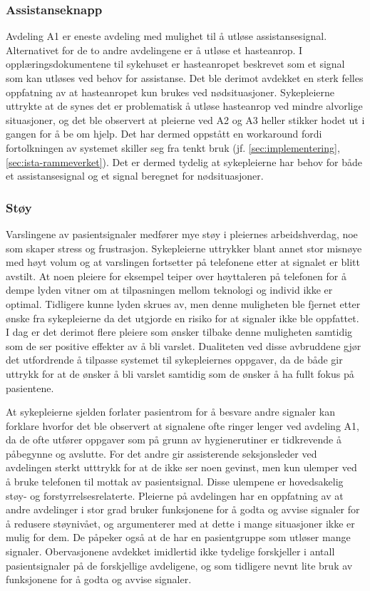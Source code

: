 \subsubsection{Assistanseknapp}
Avdeling A1 er eneste avdeling med mulighet til å utløse assistansesignal. Alternativet for de to andre avdelingene er å utløse et hasteanrop. I opplæringsdokumentene til sykehuset er hasteanropet beskrevet som et signal som kan utløses ved behov for assistanse. Det ble derimot avdekket en sterk felles oppfatning av at hasteanropet kun brukes ved nødsituasjoner. Sykepleierne uttrykte at de synes det er problematisk å utløse hasteanrop ved mindre alvorlige situasjoner, og det ble observert at pleierne ved A2 og A3 heller stikker hodet ut i gangen for å be om hjelp. Det har dermed oppstått en workaround fordi fortolkningen av systemet skiller seg fra tenkt bruk (jf. \ref{sec:implementering}, \ref{sec:ista-rammeverket}). Det er dermed tydelig at sykepleierne har behov for både et assistansesignal og et signal beregnet for nødsituasjoner.
  
\subsubsection{Støy}
Varslingene av pasientsignaler medfører mye støy i pleiernes arbeidshverdag, noe som skaper stress og frustrasjon. Sykepleierne uttrykker blant annet stor misnøye med høyt volum og at varslingen fortsetter på telefonene etter at signalet er blitt avstilt. At noen pleiere for eksempel teiper over høyttaleren på telefonen for å dempe lyden vitner om at tilpasningen mellom teknologi og individ ikke er optimal. Tidligere kunne lyden skrues av, men denne muligheten ble fjernet etter ønske fra sykepleierne da det utgjorde en risiko for at signaler ikke ble oppfattet. I dag er det derimot flere pleiere som ønsker tilbake denne muligheten samtidig som de ser positive effekter av å bli varslet. Dualiteten ved disse avbruddene gjør det utfordrende å tilpasse systemet til sykepleiernes oppgaver, da de både gir uttrykk for at de ønsker å bli varslet samtidig som de ønsker å ha fullt fokus på pasientene. 

\noindent
At sykepleierne sjelden forlater pasientrom for å besvare andre signaler kan forklare hvorfor det ble observert at signalene ofte ringer lenger ved avdeling A1, da de ofte utfører oppgaver som på grunn av hygienerutiner er tidkrevende å påbegynne og avslutte. For det andre gir assisterende seksjonsleder ved avdelingen sterkt utttrykk for at de ikke ser noen gevinst, men kun ulemper ved å bruke telefonen til mottak av pasientsignal. Disse ulempene er hovedsakelig støy- og forstyrrelsesrelaterte. Pleierne på avdelingen har en oppfatning av at andre avdelinger i stor grad bruker funksjonene for å godta og avvise signaler for å redusere støynivået, og argumenterer med at dette i mange situasjoner ikke er mulig for dem. De påpeker også at de har en pasientgruppe som utløser mange signaler. Obervasjonene avdekket imidlertid ikke tydelige forskjeller i antall pasientsignaler på de forskjellige avdeligene, og som tidligere nevnt lite bruk av funksjonene for å godta og avvise signaler.

